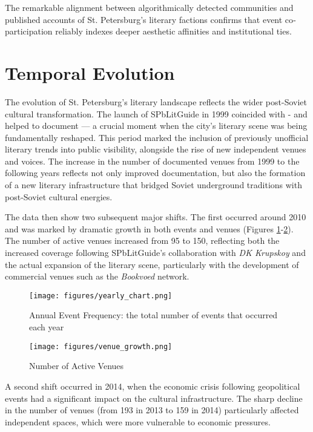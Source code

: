 \documentclass{jcls}
\begin{document}
The remarkable alignment between algorithmically detected communities and published accounts of St. Petersburg’s literary factions confirms that event co‐participation reliably indexes deeper aesthetic affinities and institutional ties.

\section{Temporal Evolution}

The evolution of St. Petersburg's literary landscape reflects the wider post-Soviet cultural transformation. The launch of SPbLitGuide in 1999 coincided with - and helped to document — a crucial moment when the city's literary scene was being fundamentally reshaped. This period marked the inclusion of previously unofficial literary trends into public visibility, alongside the rise of new independent venues and voices. The increase in the number of documented venues from 1999 to the following years reflects not only improved documentation, but also the formation of a new literary infrastructure that bridged Soviet underground traditions with post-Soviet cultural energies.

The data then show two subsequent major shifts. The first occurred around 2010 and was marked by dramatic growth in both events and venues (Figures \ref{annualevents}-\ref{annualvenues}). The number of active venues increased from 95 to 150, reflecting both the increased coverage following SPbLitGuide's collaboration with \textit{DK Krupskoy} and the actual expansion of the literary scene, particularly with the development of commercial venues such as the \textit{Bookvoed} network.

\begin{figure}
	\texttt{[image: figures/yearly\_chart.png]}
	\caption{Annual Event Frequency: the total number of events that occurred each year}
    \label{annualevents}
\end{figure}

\begin{figure}
	\texttt{[image: figures/venue\_growth.png]}
	\caption{Number of Active Venues}
    \label{annualvenues}
\end{figure}

A second shift occurred in 2014, when the economic crisis following geopolitical events had a significant impact on the cultural infrastructure. The sharp decline in the number of venues (from 193 in 2013 to 159 in 2014) particularly affected independent spaces, which were more vulnerable to economic pressures. 
\end{document}
